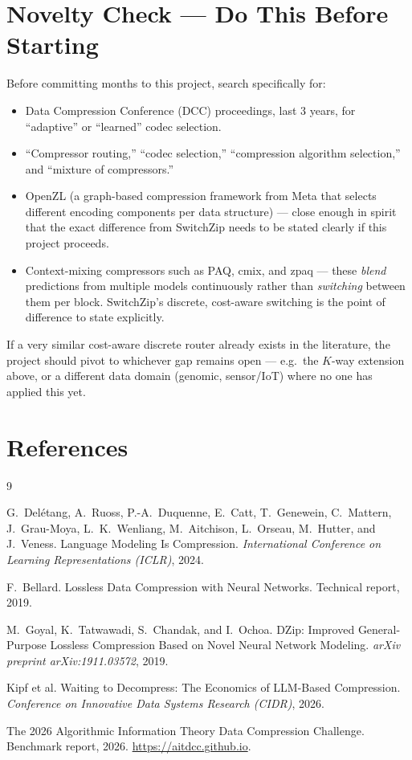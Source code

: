 \documentclass[11pt]{article}
\begin{document}
\section{Novelty Check --- Do This Before Starting}
Before committing months to this project, search specifically for:
\begin{itemize}[nosep]
  \item Data Compression Conference (DCC) proceedings, last 3 years, for
  ``adaptive'' or ``learned'' codec selection.
  \item ``Compressor routing,'' ``codec selection,'' ``compression
  algorithm selection,'' and ``mixture of compressors.''
  \item OpenZL (a graph-based compression framework from Meta that
  selects different encoding components per data structure) --- close
  enough in spirit that the exact difference from SwitchZip needs to be
  stated clearly if this project proceeds.
  \item Context-mixing compressors such as PAQ, cmix, and zpaq --- these
  \emph{blend} predictions from multiple models continuously rather than
  \emph{switching} between them per block. SwitchZip's discrete,
  cost-aware switching is the point of difference to state explicitly.
\end{itemize}
If a very similar cost-aware discrete router already exists in the
literature, the project should pivot to whichever gap remains open ---
e.g.\ the $K$-way extension above, or a different data domain (genomic,
sensor/IoT) where no one has applied this yet.

\section*{References}
\begin{thebibliography}{9}

G.~Del\'etang, A.~Ruoss, P.-A.~Duquenne, E.~Catt, T.~Genewein, C.~Mattern,
J.~Grau-Moya, L.~K.~Wenliang, M.~Aitchison, L.~Orseau, M.~Hutter, and
J.~Veness.
\newblock Language Modeling Is Compression.
\newblock \emph{International Conference on Learning Representations
(ICLR)}, 2024.

F.~Bellard.
\newblock Lossless Data Compression with Neural Networks.
\newblock Technical report, 2019.

M.~Goyal, K.~Tatwawadi, S.~Chandak, and I.~Ochoa.
\newblock DZip: Improved General-Purpose Lossless Compression Based on
Novel Neural Network Modeling.
\newblock \emph{arXiv preprint arXiv:1911.03572}, 2019.

Kipf et al.
\newblock Waiting to Decompress: The Economics of LLM-Based Compression.
\newblock \emph{Conference on Innovative Data Systems Research (CIDR)},
2026.

The 2026 Algorithmic Information Theory Data Compression Challenge.
\newblock Benchmark report, 2026. \url{https://aitdcc.github.io}.

\end{thebibliography}
\end{document}
